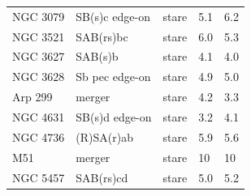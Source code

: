 \documentclass[legal,11pt]{article}
\begin{document}
\begin{table}
\begin{tabular}{l l l l l }
     NGC 3079      &      SB(s)c edge-on    &  stare           &     5.1                 & 6.2   \\
    NGC 3521       &      SAB(rs)bc         &  stare           &     6.0                 & 5.3   \\
     NGC 3627      &      SAB(s)b           &  stare           &     4.1                 & 4.0   \\
     NGC 3628      &      Sb pec edge-on    &  stare           &     4.9                 & 5.0   \\
    Arp 299        &      merger            &  stare           &     4.2                 & 3.3   \\
     NGC 4631      &      SB(s)d edge-on    &  stare           &     3.2                 & 4.1   \\
    NGC 4736       &      (R)SA(r)ab        &  stare           &     5.9                 & 5.6   \\
     M51           &      merger            &  stare           &     10                  & 10    \\
    NGC 5457       &      SAB(rs)cd         &  stare           &     5.0                 & 5.2   \\
\hline
\end{tabular}
\end{table}




\end{document}
